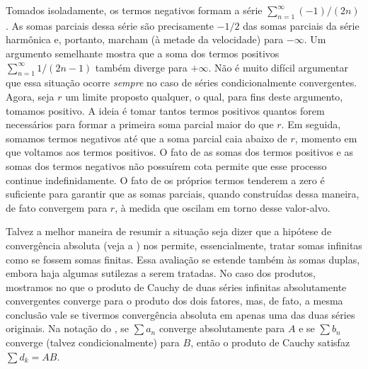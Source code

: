 Tomados isoladamente, os termos negativos formam a série $\sum_{n=1}^{\infty} (-1)/(2n)$. As somas parciais dessa série são precisamente $-1/2$ das somas parciais da série harmônica e, portanto, marcham (à metade da velocidade) para $-\infty$. Um argumento semelhante mostra que a soma dos termos positivos $\sum_{n=1}^{\infty} 1/(2n - 1)$ também diverge para $+\infty$. Não é muito difícil argumentar que essa situação ocorre \textit{sempre} no caso de séries condicionalmente convergentes. Agora, seja $r$ um limite proposto qualquer, o qual, para fins deste argumento, tomamos positivo. A ideia é tomar tantos termos positivos quantos forem necessários para formar a primeira soma parcial maior do que $r$. Em seguida, somamos termos negativos até que a soma parcial caia abaixo de $r$, momento em que voltamos aos termos positivos. O fato de as somas dos termos positivos e as somas dos termos negativos não possuírem cota permite que esse processo continue indefinidamente. O fato de os próprios termos tenderem a zero é suficiente para garantir que as somas parciais, quando construídas dessa maneira, de fato convergem para $r$, à medida que oscilam em torno desse valor-alvo.

Talvez a melhor maneira de resumir a situação seja dizer que a hipótese de convergência absoluta (veja a ) nos permite, essencialmente, tratar somas infinitas como se fossem somas finitas. Essa avaliação se estende também às somas duplas, embora haja algumas sutilezas a serem tratadas. No caso dos produtos, mostramos no  que o produto de Cauchy de duas séries infinitas absolutamente convergentes converge para o produto dos dois fatores, mas, de fato, a mesma conclusão vale se tivermos convergência absoluta em apenas uma das duas séries originais. Na notação do , se $\sum a_n$ converge absolutamente para $A$ e se $\sum b_n$ converge (talvez condicionalmente) para $B$, então o produto de Cauchy satisfaz $\sum d_k = AB$.  

